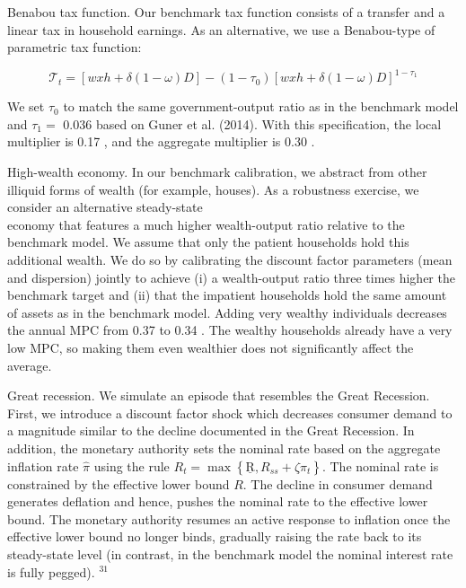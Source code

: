 \documentclass[10pt]{article}
\begin{document}
Benabou tax function. Our benchmark tax function consists of a transfer and a linear tax in household earnings. As an alternative, we use a Benabou-type of parametric tax function:

$$
\mathcal{T}_{t}=[w x h+\delta(1-\omega) D]-\left(1-\tau_{0}\right)[w x h+\delta(1-\omega) D]^{1-\tau_{1}}
$$

We set $\tau_{0}$ to match the same government-output ratio as in the benchmark model and $\tau_{1}=$ 0.036 based on Guner et al. (2014). With this specification, the local multiplier is 0.17 , and the aggregate multiplier is 0.30 .

High-wealth economy. In our benchmark calibration, we abstract from other illiquid forms of wealth (for example, houses). As a robustness exercise, we consider an alternative steady-state\\
economy that features a much higher wealth-output ratio relative to the benchmark model. We assume that only the patient households hold this additional wealth. We do so by calibrating the discount factor parameters (mean and dispersion) jointly to achieve (i) a wealth-output ratio three times higher the benchmark target and (ii) that the impatient households hold the same amount of assets as in the benchmark model. Adding very wealthy individuals decreases the annual MPC from 0.37 to 0.34 . The wealthy households already have a very low MPC, so making them even wealthier does not significantly affect the average.

Great recession. We simulate an episode that resembles the Great Recession. First, we introduce a discount factor shock which decreases consumer demand to a magnitude similar to the decline documented in the Great Recession. In addition, the monetary authority sets the nominal rate based on the aggregate inflation rate $\hat{\pi}$ using the rule $R_{t}=\max \left\{\underline{\mathrm{R}}, R_{s s}+\zeta \hat{\pi}_{t}\right\}$. The nominal rate is constrained by the effective lower bound $R$. The decline in consumer demand generates deflation and hence, pushes the nominal rate to the effective lower bound. The monetary authority resumes an active response to inflation once the effective lower bound no longer binds, gradually raising the rate back to its steady-state level (in contrast, in the benchmark model the nominal interest rate is fully pegged). ${ }^{31}$
\end{document}
